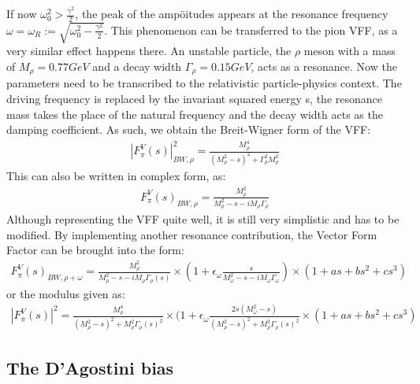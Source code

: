 \documentclass[a4paper]{article}
\begin{document}
If now $\omega_0^2>\frac{\gamma^2}{2}$, the peak of the ampöitudes appears at the
resonance frequency \newline
$\omega=\omega_R:=\sqrt{\omega_0^2-\frac{\gamma^2}{2}}$. This phenomenon can be
transferred to the pion VFF, as a very similar effect happens there. An
unstable particle, the $\rho$ meson with a mass of $M_\rho=0.77GeV$ and a decay
width $\Gamma_\rho=0.15GeV$, acts as a resonance. Now the parameters need to be
transcribed to the relativistic particle-physics context. The driving frequency
is replaced by the invariant squared energy s, the resonance mass takes the
place of the natural frequency and the decay width acts as the damping
coefficient. As such, we obtain the Breit-Wigner form of the VFF:
\begin{align}
|F_\pi^V(s)|^2_{BW,\rho}=\frac{M_\rho^4}{(M_\rho^2-s)^2+\Gamma_\rho^2M_\rho^2}
\end{align}
This can also be written in complex form, as:
    \begin{align}
F_\pi^V(s)_{BW,\rho}=\frac{M_\rho^2}{M_\rho^2-s-iM_\rho\Gamma_\rho}
    \end{align}
Although representing the VFF quite well, it is still very simplistic and has
to be modified. By implementing another resonance contribution, the Vector Form
Factor can be brought into the form:
        \begin{align}
F_\pi^V(s)_{BW,\rho+\omega}=\frac{M_\rho^2}{M_\rho^2-s-iM_\rho\Gamma_\rho(s)}\times(1+\epsilon_\omega\frac{s}{M_\omega^2-s-iM_\omega\Gamma_\omega})\times(1+as+bs^2+cs^3)
        \end{align}
or the modulus given as:
        \begin{align}
            |F_\pi^V(s)|^2=\frac{M_\rho^4}{(M_\rho^2-s)^2+M_\rho^2\Gamma_\rho(s)^2}\times(1+\epsilon_\omega\frac{2s(M_\omega^2-s)}{(M_\rho^2-s)^2+M_\rho^2\Gamma_\rho(s)^2}\times(1+as+bs^2+cs^3)
        \end{align}
\subsection{The D'Agostini bias}
\end{document}
